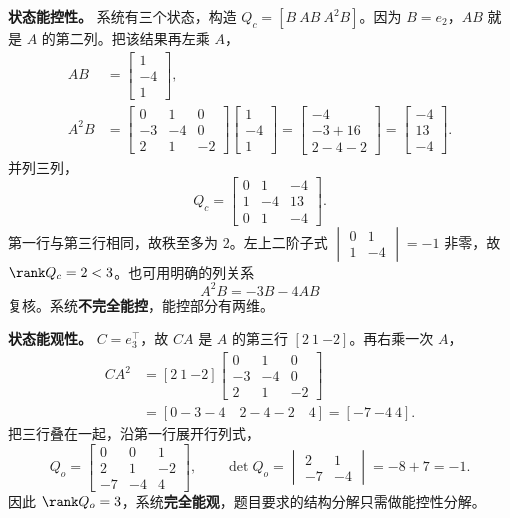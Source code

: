 \textbf{状态能控性。} 系统有三个状态，构造 $Q_c=[B\ AB\ A^2B]$。因为 $B=e_2$，$AB$ 就是 $A$ 的第二列。把该结果再左乘 $A$，
\[
\begin{aligned}
    AB&=\begin{bmatrix}1\\-4\\1\end{bmatrix},\\
    A^2B&=\begin{bmatrix}0&1&0\\-3&-4&0\\2&1&-2\end{bmatrix}
        \begin{bmatrix}1\\-4\\1\end{bmatrix}
      =\begin{bmatrix}-4\\-3+16\\2-4-2\end{bmatrix}
      =\begin{bmatrix}-4\\13\\-4\end{bmatrix}.
\end{aligned}
\]
并列三列，
\[
    Q_c=\begin{bmatrix}0&1&-4\\1&-4&13\\0&1&-4\end{bmatrix}.
\]
第一行与第三行相同，故秩至多为 $2$。左上二阶子式
$\begin{vmatrix}0&1\\1&-4\end{vmatrix}=-1$ 非零，故 $\rank Q_c=2<3$。也可用明确的列关系
\[
    A^2B=-3B-4AB
\]
复核。系统\textbf{不完全能控}，能控部分有两维。

\textbf{状态能观性。} $C=e_3^\top$，故 $CA$ 是 $A$ 的第三行 $[2\ 1\ {-2}]$。再右乘一次 $A$，
\[
\begin{aligned}
    CA^2 &=[2\ 1\ {-2}]
       \begin{bmatrix}0&1&0\\-3&-4&0\\2&1&-2\end{bmatrix}\\
         &=[0-3-4\quad 2-4-2\quad 4]=[-7\ {-4}\ 4].
\end{aligned}
\]
把三行叠在一起，沿第一行展开行列式，
\[
    Q_o=\begin{bmatrix}0&0&1\\2&1&-2\\-7&-4&4\end{bmatrix},
    \qquad \det Q_o=\begin{vmatrix}2&1\\-7&-4\end{vmatrix}
             =-8+7=-1 .
\]
因此 $\rank Q_o=3$，系统\textbf{完全能观}，题目要求的结构分解只需做能控性分解。

